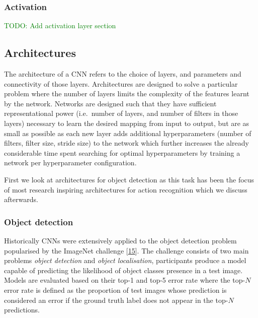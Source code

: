\documentclass[A4paper,draft]{scrreprt}
\begin{document}
\subsubsection{Activation}\label{activation}

\textcolor{green}{TODO: Add activation layer section}\newline

\subsection{Architectures}\label{architectures}

The architecture of a CNN refers to the choice of layers, and parameters
and connectivity of those layers. Architectures are designed to solve a
particular problem where the number of layers limits the complexity of
the features learnt by the network. Networks are designed such that they
have sufficient representational power (i.e.~number of layers, and
number of filters in those layers) necessary to learn the desired
mapping from input to output, but are as small as possible as each new
layer adds additional hyperparameters (number of filters, filter size,
stride size) to the network which further increases the already
considerable time spent searching for optimal hyperparameters by
training a network per hyperparameter configuration.

First we look at architectures for object detection as this task has
been the focus of most research inspiring architectures for action
recognition which we discuss afterwards.

\subsubsection{Object detection}\label{sec:background:object-detection}

Historically CNNs were extensively applied to the object detection
problem popularised by the ImageNet challenge
{[}\protect\hyperlink{ref-russakovsky2014_ImageNetLargeScale}{15}{]}.
The challenge consists of two main problems \emph{object detection} and
\emph{object localisation}, participants produce a model capable of
predicting the likelihood of object classes presence in a test image.
Models are evaluated based on their top-1 and top-5 error rate where the
top-\(N\) error rate is defined as the proportion of test images whose
prediction is considered an error if the ground truth label does not
appear in the top-\(N\) predictions.
\end{document}
